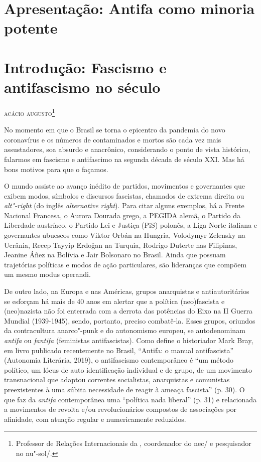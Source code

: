 
\chapter{Apresentação: Antifa como minoria potente}

\lipsum[5]
\lipsum[2]
\lipsum[1]

\chapter{Introdução: Fascismo e antifascismo no século }

\hfill{}\textsc{acácio augusto\footnote{Professor de Relações Internacionais da , coordenador do nec/ e pesquisador no nu"-sol/.}}

\bigskip

No momento em que o Brasil se torna o epicentro da pandemia do novo
coronavírus e os números de contaminados e mortos são cada vez mais
assustadores, soa absurdo e anacrônico, considerando o ponto de vista
histórico, falarmos em fascismo e antifascimo na segunda década de
século XXI. Mas há bons motivos para que o façamos.

O mundo assiste ao avanço inédito de partidos, movimentos e governantes
que exibem modos, símbolos e discursos fascistas, chamados de extrema
direita ou \emph{alt"-right} (do inglês \emph{alternative right}). Para
citar alguns exemplos, há a Frente Nacional Francesa, o Aurora Dourada
grego, a PEGIDA alemã, o Partido da Liberdade austríaco, o Partido Lei e
Justiça (PiS) polonês, a Liga Norte italiana e governantes ubuescos como
Viktor Orbán na Hungria, Volodymyr Zelensky na Ucrânia, Recep Tayyip
Erdoğan na Turquia, Rodrigo Duterte nas Filipinas, Jeanine Áñez na
Bolívia e Jair Bolsonaro no Brasil. Ainda que possuam trajetórias
políticas e modos de ação particulares, são lideranças que compõem um
mesmo modus operandi.

De outro lado, na Europa e nas Américas, grupos anarquistas e
antiautoritários se esforçam há mais de 40 anos em alertar que a
política (neo)fascista e (neo)nazista não foi enterrada com a derrota
das potências do Eixo na II Guerra Mundial (1939-1945), sendo, portanto,
preciso combatê-la. Esses grupos, oriundos da contracultura anarco"-punk
e do autonomismo europeu, se autodenominam \emph{antifa} ou
\emph{fantifa} (feministas antifascistas). Como define o historiador
Mark Bray, em livro publicado recentemente no Brasil, ``Antifa: o manual
antifascista'' (Autonomia Literária, 2019), o antifascismo contemporâneo
é ``um método político, um lócus de auto identificação individual e de
grupo, de um movimento transnacional que adaptou correntes socialistas,
anarquistas e comunistas preexistentes à uma súbita necessidade de
reagir à ameaça fascista'' (p. 30). O que faz da \emph{antifa}
contemporânea uma ``política nada liberal'' (p. 31) e relacionada a
movimentos de revolta e/ou revolucionários compostos de associações por
afinidade, com atuação regular e numericamente reduzidos.

